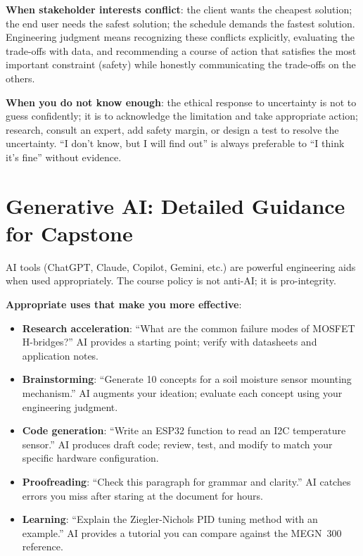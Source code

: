 \textbf{When stakeholder interests conflict}: the client wants the cheapest solution; the end user needs the safest solution; the schedule demands the fastest solution. Engineering judgment means recognizing these conflicts explicitly, evaluating the trade-offs with data, and recommending a course of action that satisfies the most important constraint (safety) while honestly communicating the trade-offs on the others.

\textbf{When you do not know enough}: the ethical response to uncertainty is not to guess confidently; it is to acknowledge the limitation and take appropriate action; research, consult an expert, add safety margin, or design a test to resolve the uncertainty. ``I don't know, but I will find out'' is always preferable to ``I think it's fine'' without evidence.

\section{Generative AI: Detailed Guidance for Capstone}
AI tools (ChatGPT, Claude, Copilot, Gemini, etc.) are powerful engineering aids when used appropriately. The course policy is not anti-AI; it is pro-integrity.

\textbf{Appropriate uses that make you more effective}:
\begin{itemize}[nosep,leftmargin=1.5em]
\item \textbf{Research acceleration}: ``What are the common failure modes of MOSFET H-bridges?'' AI provides a starting point; verify with datasheets and application notes.
\item \textbf{Brainstorming}: ``Generate 10 concepts for a soil moisture sensor mounting mechanism.'' AI augments your ideation; evaluate each concept using your engineering judgment.
\item \textbf{Code generation}: ``Write an ESP32 function to read an I2C temperature sensor.'' AI produces draft code; review, test, and modify to match your specific hardware configuration.
\item \textbf{Proofreading}: ``Check this paragraph for grammar and clarity.'' AI catches errors you miss after staring at the document for hours.
\item \textbf{Learning}: ``Explain the Ziegler-Nichols PID tuning method with an example.'' AI provides a tutorial you can compare against the MEGN~300 reference.
\end{itemize}

